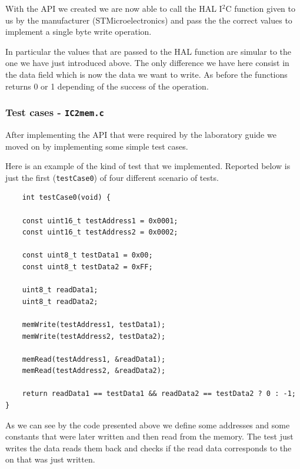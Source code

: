 \documentclass[../main.tex]{subfiles}
\begin{document}
\vspace{0.5cm}


With the API we created we are now able to call the HAL I$^2$C function given to us by the manufacturer (STMicroelectronics) and pass the the correct values to implement a single byte write operation.

In particular the values that are passed to the HAL function are simular to the one we have just introduced above. The only difference we have here consist in the data field which is now the data we want to write.
As before the functions returns 0 or 1 depending of the success of the operation.

\subsubsection*{Test cases - \texttt{IC2mem.c}}

After implementing the API that were required by the laboratory guide we moved on by implementing some simple test cases.

Here is an example of the kind of test that we implemented.
Reported below is just the first (\texttt{testCase0}) of four different scenario of tests.\\

\begin{lstlisting}
	int testCase0(void) {

    const uint16_t testAddress1 = 0x0001;
    const uint16_t testAddress2 = 0x0002;

    const uint8_t testData1 = 0x00;
    const uint8_t testData2 = 0xFF;

    uint8_t readData1;
    uint8_t readData2;

    memWrite(testAddress1, testData1);
    memWrite(testAddress2, testData2);

    memRead(testAddress1, &readData1);
    memRead(testAddress2, &readData2);

    return readData1 == testData1 && readData2 == testData2 ? 0 : -1;
}
\end{lstlisting}

\vspace{0.5cm}

As we can see by the code presented above we define some addresses and some constants that were later written and then read from the memory.
The test just writes the data reads them back and checks if the read data corresponds to the on that was just written.\\
\end{document}

